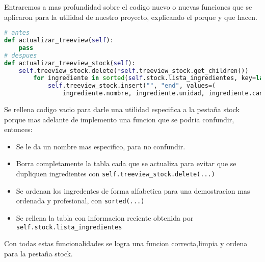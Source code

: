 \documentclass[a4paper,12pt]{article}
\begin{document}
Entraremos a mas profundidad sobre el codigo nuevo o nuevas funciones que se aplicaron para la utilidad de nuestro proyecto, explicando el porque y que hacen.

\begin{lstlisting}[language=Python, caption={Implementaciones de codigo}, frame=single]
# antes
def actualizar_treeview(self):
    pass
# despues
def actualizar_treeview_stock(self):
    self.treeview_stock.delete(*self.treeview_stock.get_children())
        for ingrediente in sorted(self.stock.lista_ingredientes, key=lambda item: item.nombre):
            self.treeview_stock.insert("", "end", values=(
                ingrediente.nombre, ingrediente.unidad, ingrediente.cantidad))
\end{lstlisting}

Se rellena codigo vacio para darle una utilidad especifica a la pestaña stock porque mas adelante de implemento una funcion que se podria confundir, entonces:

\newpage

\begin{itemize}
    \item Se le da un nombre mas especifico, para no confundir.
    \item Borra completamente la tabla cada que se actualiza para evitar que se dupliquen ingredientes con \verb|self.treeview_stock.delete(...)|
    \item Se ordenan los ingredentes de forma alfabetica para una demostracion mas ordenada y profesional, con \verb|sorted(...)|
    \item Se rellena la tabla con informacion reciente obtenida por \verb|self.stock.lista_ingredientes|
\end{itemize}
Con todas estas funcionalidades se logra una funcion correcta,limpia y ordena para la pestaña stock.
\end{document}
